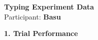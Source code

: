 \documentclass[10pt,a4paper]{article}
\begin{document}

\begin{center}
    {\Large\bfseries Typing Experiment Data}\\
    \vspace{2pt}
    Participant: \textbf{Basu}
\end{center}

\vspace{0.25cm}


\noindent
{\large\bfseries 1. Trial Performance}

\vspace{0.08cm}
\end{document}
